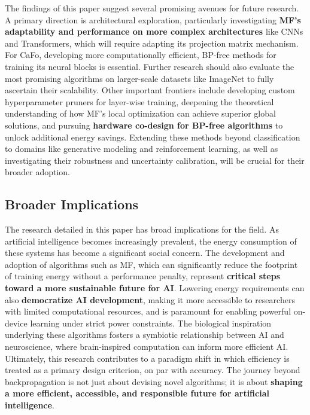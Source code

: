 The findings of this paper suggest several promising avenues for future research. A primary direction is architectural exploration, particularly investigating \textbf{MF's adaptability and performance on more complex architectures} like CNNs and Transformers, which will require adapting its projection matrix mechanism. For CaFo, developing more computationally efficient, BP-free methods for training its neural blocks is essential. Further research should also evaluate the most promising algorithms on larger-scale datasets like ImageNet to fully ascertain their scalability. Other important frontiers include developing custom hyperparameter pruners for layer-wise training, deepening the theoretical understanding of how MF's local optimization can achieve superior global solutions, and pursuing \textbf{hardware co-design for BP-free algorithms} to unlock additional energy savings. Extending these methods beyond classification to domains like generative modeling and reinforcement learning, as well as investigating their robustness and uncertainty calibration, will be crucial for their broader adoption.

\subsection{Broader Implications}
\label{sec:conclusion_implications}

The research detailed in this paper has broad implications for the field. As artificial intelligence becomes increasingly prevalent, the energy consumption of these systems has become a significant social concern. The development and adoption of algorithms such as MF, which can significantly reduce the footprint of training energy without a performance penalty, represent \textbf{critical steps toward a more sustainable future for AI}. Lowering energy requirements can also \textbf{democratize AI development}, making it more accessible to researchers with limited computational resources, and is paramount for enabling powerful on-device learning under strict power constraints. The biological inspiration underlying these algorithms fosters a symbiotic relationship between AI and neuroscience, where brain-inspired computation can inform more efficient AI. Ultimately, this research contributes to a paradigm shift in which efficiency is treated as a primary design criterion, on par with accuracy. The journey beyond backpropagation is not just about devising novel algorithms; it is about \textbf{shaping a more efficient, accessible, and responsible future for artificial intelligence}.
